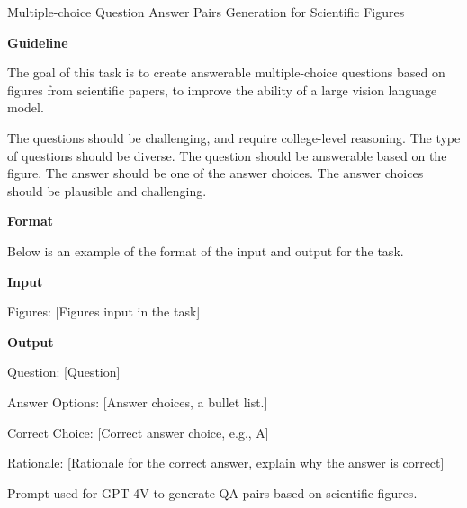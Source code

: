 \begin{table}[t!]
    \centering
    \tiny 
    \begin{tcolorbox}
Multiple-choice Question Answer Pairs Generation for Scientific Figures

\textbf{Guideline}

The goal of this task is to create answerable multiple-choice questions based on figures from scientific papers, to improve the ability of a large vision language model.

The questions should be challenging, and require college-level reasoning. The type of questions should be diverse. The question should be answerable based on the figure. The answer should be one of the answer choices. The answer choices should be plausible and challenging. 


\textbf{Format}

Below is an example of the format of the input and output for the task.

\textbf{Input}

Figures: [Figures input in the task]

\textbf{Output}

Question: [Question]

Answer Options: [Answer choices, a bullet list.]

Correct Choice: [Correct answer choice, e.g., A]

Rationale: [Rationale for the correct answer, explain why the answer is correct]
    \end{tcolorbox}
    \caption{Prompt used for GPT-4V to generate QA pairs based on scientific figures.}
    \label{tab:prompt_for_ArXivqa}
\end{table}